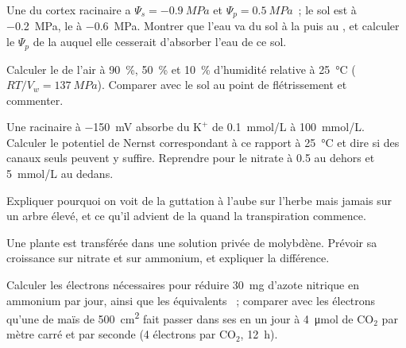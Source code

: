 \begin{exercise}[$\star\star$]\label{exo:b1:plant-water-minerals:5}
Une  du cortex racinaire a $\Psi_s = \qty{-0.9}{MPa}$ et $\Psi_p =
\qty{0.5}{MPa}$~; le sol est à \qty{-0.2}{MPa}, le  à
\qty{-0.6}{MPa}. Montrer que l'eau va du sol à la  puis au
, et calculer le $\Psi_p$ de la  auquel elle cesserait
d'absorber l'eau de ce sol.
\end{exercise}

\begin{exercise}[$\star\star$]\label{exo:b1:plant-water-minerals:6}
Calculer le  de l'air à \qty{90}{\%}, \qty{50}{\%} et
\qty{10}{\%} d'humidité relative à \qty{25}{\celsius} ($RT/V_w =
\qty{137}{MPa}$). Comparer avec le sol au point de flétrissement et
commenter.
\end{exercise}

\begin{exercise}[$\star\star$]\label{exo:b1:plant-water-minerals:7}
Une  racinaire à \qty{-150}{mV} absorbe du $\mathrm{K^+}$ de
\qty{0.1}{mmol/L} à \qty{100}{mmol/L}. Calculer le potentiel de Nernst
correspondant à ce rapport à \qty{25}{\celsius} et dire si des canaux
seuls peuvent y suffire. Reprendre pour le nitrate à \qty{0.5}{} au
dehors et \qty{5}{mmol/L} au dedans.
\end{exercise}

\begin{exercise}[$\star\star$]\label{exo:b1:plant-water-minerals:8}
Expliquer pourquoi on voit de la guttation à l'aube sur l'herbe mais
jamais sur un arbre élevé, et ce qu'il advient de la 
quand la transpiration commence.
\end{exercise}

\begin{exercise}[$\star\star$]\label{exo:b1:plant-water-minerals:9}
Une plante est transférée dans une solution privée de molybdène.
Prévoir sa croissance sur nitrate et sur ammonium, et expliquer la
différence.
\end{exercise}

\begin{exercise}[$\star\star\star$]\label{exo:b1:plant-water-minerals:10}
Calculer les électrons nécessaires pour réduire \qty{30}{mg} d'azote
nitrique en ammonium par jour, ainsi que les équivalents ~;
comparer avec les électrons qu'une  de maïs de \qty{500}{cm^2}
fait passer dans ses  en un jour à \qty{4}{\micro mol} de
$\mathrm{CO_2}$ par mètre carré et par seconde (4 électrons par
$\mathrm{CO_2}$, \qty{12}{h}).
\end{exercise}

